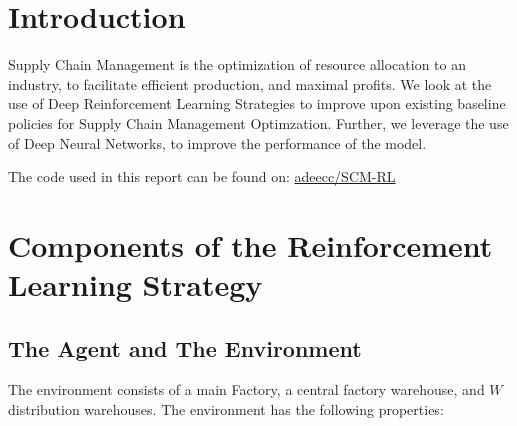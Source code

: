 \documentclass{article}
\begin{document}
\section{Introduction}

Supply Chain Management is the optimization of resource allocation to an industry, to facilitate efficient production, and maximal profits. We look at the use of Deep Reinforcement Learning Strategies to improve upon existing baseline policies for Supply Chain Management Optimzation. Further, we leverage the use of Deep Neural Networks, to improve the performance of the model.

The code used in this report can be found on: \href{https://github.com/adeecc/SCM-RL}{adeecc/SCM-RL}


\section{Components of the Reinforcement Learning Strategy}

\subsection{The Agent and The Environment}
The environment consists of a main Factory, a central factory warehouse, and $W$ distribution warehouses. The environment has the following properties:

\end{document}
